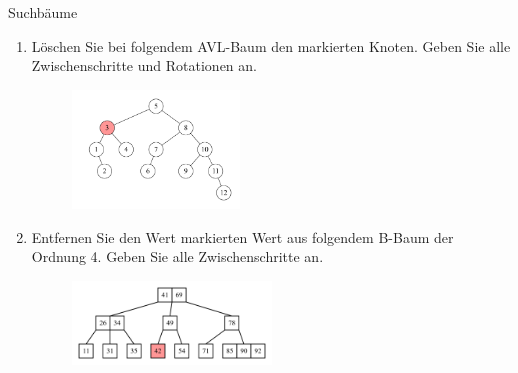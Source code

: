 \documentclass[11pt,a4paper]{article}
\begin{document}
\begin{aufgabe}{5}{Suchbäume}
    \begin{enumerate}
        \item Löschen Sie bei folgendem AVL-Baum den markierten Knoten. Geben Sie alle Zwischenschritte und Rotationen an.
        \begin{figure}[h!]
            \centering
            \includegraphics[width=0.42\textwidth]{img/avl.png}
        \end{figure}
        \FloatBarrier   
        \item Entfernen Sie den Wert markierten Wert aus folgendem B-Baum der Ordnung 4. Geben Sie alle Zwischenschritte an.
        \begin{figure}[h!]
            \centering
            \includegraphics[width=0.5\textwidth]{img/b_tree.png}
        \end{figure}
        \FloatBarrier   
    \end{enumerate}
\end{aufgabe}
\end{document}
